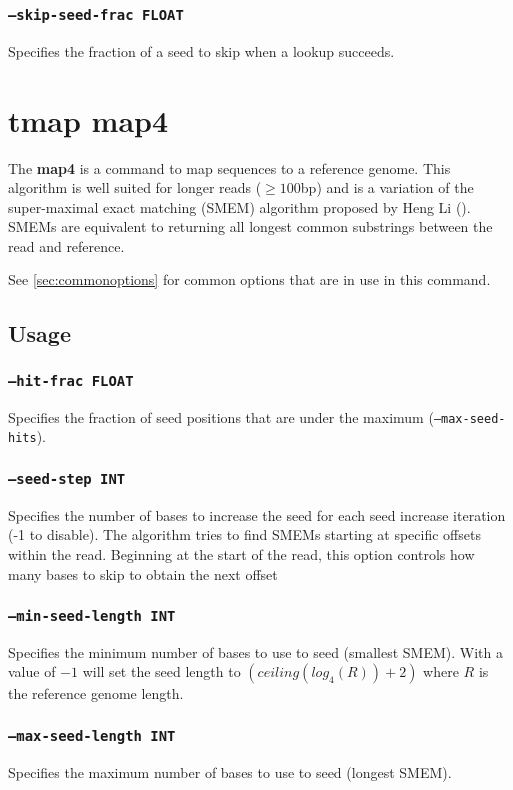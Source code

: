 \documentclass[a4paper,12pt]{book}
\newcommand{\TT}[1]{{\tt #1}} %
\newcommand{\BF}[1]{{\bf #1}} %
\begin{document}
\subsubsection{\TT{--skip-seed-frac FLOAT}}
Specifies the fraction of a seed to skip when a lookup succeeds.

\section{tmap map4}
\label{sec:map4}
The \BF{map4} is a command to map sequences to a reference genome.
This algorithm is well suited for longer reads ($\geq 100$bp) and is a variation of the super-maximal exact matching (SMEM) algorithm proposed by Heng Li (\cite{Fastmap}).
SMEMs are equivalent to returning all longest common substrings between the read and reference.

See \autoref{sec:commonoptions} for common options that are in use in this command.

\subsection{Usage}

\subsubsection{\TT{--hit-frac FLOAT}}
Specifies the fraction of seed positions that are under the maximum (\TT{--max-seed-hits}).

\subsubsection{\TT{--seed-step INT}}
Specifies the number of bases to increase the seed for each seed increase iteration (-1 to disable).
The algorithm tries to find SMEMs starting at specific offsets within the read.
Beginning at the start of the read, this option controls how many bases to skip to obtain the next offset

\subsubsection{\TT{--min-seed-length INT}}
Specifies the minimum number of bases to use to seed (smallest SMEM).
With a value of $-1$ will set the seed length to $\left(ceiling(log_4(R)) + 2\right)$ where $R$ is the reference genome length.

\subsubsection{\TT{--max-seed-length INT}}
Specifies the maximum number of bases to use to seed (longest SMEM).
\end{document}
